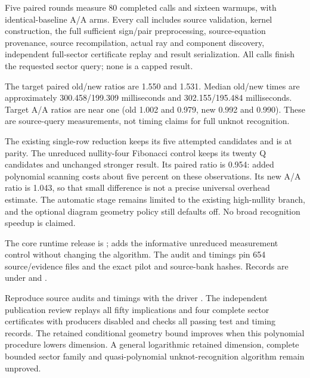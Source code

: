 Five paired rounds measure 80 completed calls and sixteen warmups, with
identical-baseline A/A arms. Every call includes source validation, kernel
construction, the full sufficient sign/pair preprocessing, source-equation
provenance, source recompilation, actual ray and component discovery,
independent full-sector certificate replay and result serialization.
All calls finish the requested sector query; none is a capped result.


The target paired old/new ratios are 1.550 and 1.531. Median old/new times
are approximately 300.458/199.309 milliseconds and 302.155/195.484
milliseconds. Target A/A ratios are near one (old 1.002 and 0.979, new
0.992 and 0.990). These are source-query measurements, not timing claims
for full unknot recognition.

The existing single-row reduction keeps its five attempted candidates and
is at parity. The unreduced nullity-four Fibonacci control keeps its twenty
Q candidates and unchanged stronger  result.
Its paired ratio is 0.954: added polynomial scanning costs about five percent
on these observations. Its new A/A ratio is 1.043, so that small difference
is not a precise universal overhead estimate. The automatic stage remains
limited to the existing high-nullity branch, and the optional diagram
geometry policy still defaults off. No broad recognition speedup is claimed.

The core runtime release is ;  adds the
informative unreduced measurement control without changing the algorithm.
The audit and timings pin 654 source/evidence files and the exact pilot and
source-bank hashes. Records are under  and
.

Reproduce source audits and timings with the driver
. The independent publication
review replays all fifty implications and four complete sector certificates
with producers disabled and checks all passing test and timing records.
The retained conditional geometry bound improves when this polynomial
procedure lowers dimension. A general logarithmic retained dimension,
complete bounded sector family and quasi-polynomial unknot-recognition
algorithm remain unproved.
